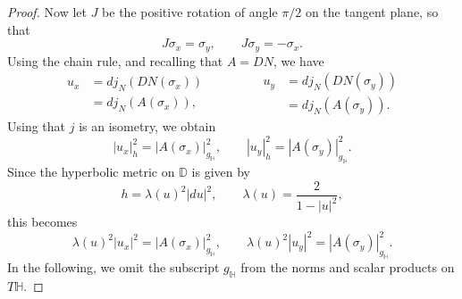 \documentclass[a4paper,11pt,openright,twoside]{book}
\newcommand{\1}{\mathds{1}}
\theoremstyle{plain}
\theoremstyle{definition}
\theoremstyle{remark}
\begin{document}
\begin{proof}
Now let $J$ be the positive rotation of angle $\pi/2$ on the tangent plane, so that
\begin{equation}\label{eq:J}
J\sigma_x=\sigma_y,\qquad J\sigma_y=-\sigma_x.
\end{equation}
Using the chain rule, and recalling that $A = DN$, we have
\begin{equation}\label{eq:uxuy}
\begin{aligned}
u_x &= dj_N(DN(\sigma_x)) \\
&= dj_N(A(\sigma_x)),
\end{aligned}
\qquad\qquad
\begin{aligned}
u_y &= dj_N(DN(\sigma_y)) \\
&= dj_N(A(\sigma_y)).
\end{aligned}
\end{equation}
Using that $j$ is an isometry, we obtain
\[
|u_x|_h^2 = |A(\sigma_x)|_{g_{\mathbb H}}^2,
\qquad
|u_y|_h^2 = |A(\sigma_y)|_{g_{\mathbb H}}^2.
\]
Since the hyperbolic metric on $\mathbb D$ is given by
\begin{equation}\label{eq:h-lambda}
h=\lambda(u)^2 |du|^2,
\qquad
\lambda(u)=\frac{2}{1-|u|^2},
\end{equation}
this becomes
\begin{equation}\label{eq:uxuy-lambda}
\lambda(u)^2 |u_x|^2 = |A(\sigma_x)|_{g_{\mathbb H}}^2,
\qquad
\lambda(u)^2 |u_y|^2 = |A(\sigma_y)|_{g_{\mathbb H}}^2.
\end{equation}
In the following, we omit the subscript $g_{\mathbb H}$ from the norms and scalar products on $T\mathbb H$.


\end{proof}
\end{document}
